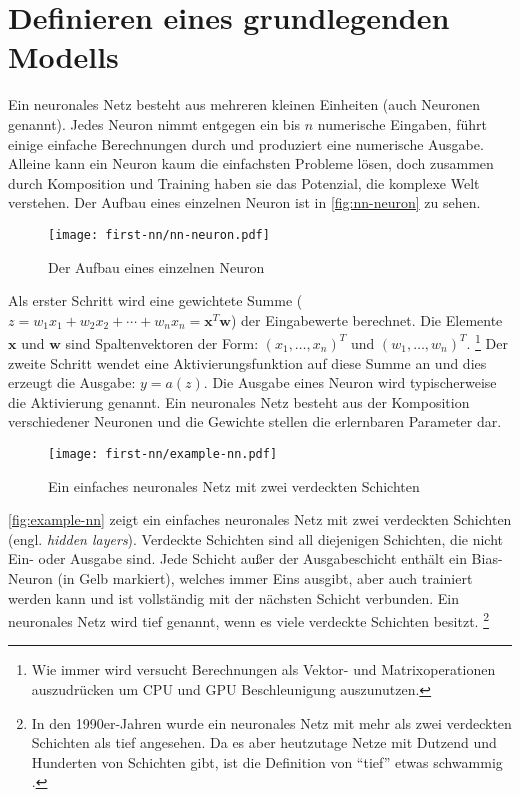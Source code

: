 \section{Definieren eines grundlegenden Modells}
Ein neuronales Netz besteht aus mehreren kleinen Einheiten (auch Neuronen genannt).
Jedes Neuron nimmt entgegen ein bis $n$ numerische Eingaben, führt einige
einfache Berechnungen durch und produziert eine numerische Ausgabe.
Alleine kann ein Neuron kaum die einfachsten Probleme lösen, doch zusammen
durch Komposition und Training haben sie das Potenzial,
die komplexe Welt verstehen.
Der Aufbau eines einzelnen Neuron ist in \autoref{fig:nn-neuron} zu sehen.
\newpage
\begin{figure}[h!]
  \centering
  \texttt{[image: first-nn/nn-neuron.pdf]}
  \caption{Der Aufbau eines einzelnen Neuron}
  \label{fig:nn-neuron}
\end{figure}
\noindent
Als erster Schritt wird eine gewichtete Summe
($z = w_1x_1 + w_2x_2 +\dotsb+ w_nx_n = \mathbf{x}^T\mathbf{w}$)
der Eingabewerte berechnet. Die Elemente $\mathbf{x}$ und $\mathbf{w}$
sind Spaltenvektoren der Form: $(x_1,\dotsc,x_n)^T$ und $(w_1,\dotsc,w_n)^T$.
\footnote{Wie immer wird versucht Berechnungen als Vektor- und Matrixoperationen
auszudrücken um CPU und GPU Beschleunigung auszunutzen.}
Der zweite Schritt wendet eine Aktivierungsfunktion auf diese Summe an und dies
erzeugt die Ausgabe: $y = a(z)$. Die Ausgabe eines Neuron
wird typischerweise die Aktivierung genannt. Ein neuronales Netz
besteht aus der Komposition verschiedener Neuronen und die
Gewichte stellen die erlernbaren Parameter dar.
\begin{figure}[h!]
  \centering
  \texttt{[image: first-nn/example-nn.pdf]}
  \caption{Ein einfaches neuronales Netz mit zwei verdeckten Schichten}
  \label{fig:example-nn}
\end{figure}
\noindent
\autoref{fig:example-nn} zeigt ein einfaches neuronales Netz
mit zwei verdeckten Schichten (engl. \textit{hidden layers}).
Verdeckte Schichten sind all diejenigen Schichten, die nicht Ein- oder Ausgabe sind.
Jede Schicht außer der Ausgabeschicht enthält ein Bias-Neuron
(in Gelb markiert), welches immer Eins ausgibt, aber auch trainiert werden kann
und ist vollständig mit der nächsten Schicht verbunden.
Ein neuronales Netz wird tief genannt, wenn es viele verdeckte Schichten besitzt.
\footnote{In den 1990er-Jahren wurde ein neuronales Netz
mit mehr als zwei verdeckten Schichten als tief angesehen.
Da es aber heutzutage Netze mit Dutzend und Hunderten von Schichten
gibt, ist die Definition von \enquote{tief} etwas schwammig \parencite[289]{book:hands-on-ml}.}
